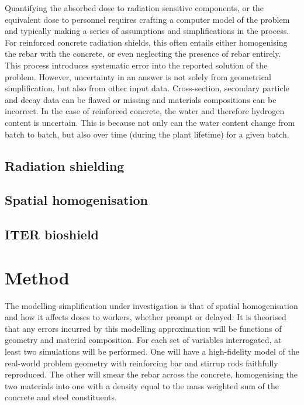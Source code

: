 Quantifying the absorbed dose to radiation sensitive components, or the equivalent dose to personnel requires crafting a computer model of the problem and typically making a series of assumptions and simplifications in the process. For reinforced concrete radiation shields, this often entails either homogenising the rebar with the concrete, or even neglecting the presence of rebar entirely. This process introduces systematic error into the reported solution of the problem. However, uncertainty in an answer is not solely from geometrical simplification, but also from other input data. Cross-section, secondary particle and decay data can be flawed or missing and materials compositions can be incorrect. In the case of reinforced concrete, the water and therefore hydrogen content is uncertain. This is because not only can the water content change from batch to batch, but also over time (during the plant lifetime) for a given batch.

\subsection{Radiation shielding}

\subsection{Spatial homogenisation}

\subsection{ITER bioshield}

\section{Method}
The modelling simplification under investigation is that of spatial homogenisation and how it affects doses to workers, whether prompt or delayed. It is theorised that any errors incurred by this modelling approximation will be functions of geometry and material composition. For each set of variables interrogated, at least two simulations will be performed. One will have a high-fidelity model of the real-world problem geometry with reinforcing bar and stirrup rods faithfully reproduced. The other will smear the rebar across the concrete, homogenising the two materials into one with a density equal to the mass weighted sum of the concrete and steel constituents. 

